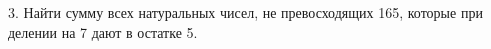 3. Найти сумму всех натуральных чисел, не превосходящих 165, которые при делении на 7 дают в остатке 5.\\
